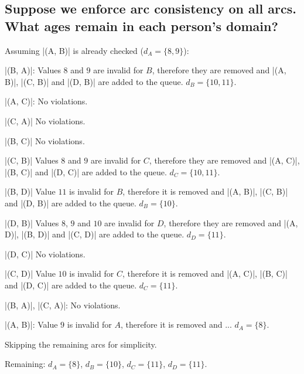 \documentclass{homework}
\begin{document}
\subsection{Suppose we enforce arc consistency on all arcs. What ages remain in each person’s domain?}
Assuming \cverb|(A, B)| is already checked ($d_A = \{8, 9\}$):

\cverb|(B, A)|: Values $8$ and $9$ are invalid for $B$, therefore they are removed and \cverb|(A, B)|, \cverb|(C, B)| and \cverb|(D, B)| are added to the queue. $d_B = \{10, 11\}$.

\cverb|(A, C)|: No violations.

\cverb|(C, A)| No violations.

\cverb|(B, C)| No violations.

\cverb|(C, B)| Values $8$ and $9$ are invalid for $C$, therefore they are removed and \cverb|(A, C)|, \cverb|(B, C)| and \cverb|(D, C)| are added to the queue. $d_C = \{10, 11\}$.

\cverb|(B, D)| Value $11$ is invalid for $B$, therefore it is removed and \cverb|(A, B)|, \cverb|(C, B)| and \cverb|(D, B)| are added to the queue. $d_B = \{10\}$.

\cverb|(D, B)| Values $8$, $9$ and $10$ are invalid for $D$, therefore they are removed and \cverb|(A, D)|, \cverb|(B, D)| and \cverb|(C, D)| are added to the queue. $d_D = \{11\}$.

\cverb|(D, C)| No violations.

\cverb|(C, D)| Value $10$ is invalid for $C$, therefore it is removed and \cverb|(A, C)|, \cverb|(B, C)| and \cverb|(D, C)| are added to the queue. $d_C = \{11\}$.

\cverb|(B, A)|, \cverb|(C, A)|: No violations.

\cverb|(A, B)|: Value $9$ is invalid for $A$, therefore it is removed and ... $d_A = \{8\}$. 

Skipping the remaining arcs for simplicity.

Remaining: $d_A = \{8\}$, $d_B = \{10\}$, $d_C = \{11\}$, $d_D = \{11\}$.

\clearpage

\renewcommand{\theenumi}{\arabic{enumi}}
\end{document}

